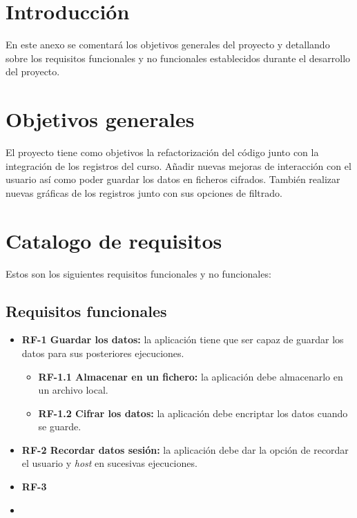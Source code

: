 
\section{Introducción}

En este anexo se comentará los objetivos generales del proyecto y detallando sobre los requisitos funcionales y no funcionales establecidos durante el desarrollo del proyecto.

\section{Objetivos generales}
El proyecto tiene como objetivos la refactorización del código junto con la integración de los registros del curso. Añadir nuevas mejoras de interacción con el usuario así como poder guardar los datos en ficheros cifrados. También realizar nuevas gráficas de los registros junto con sus opciones de filtrado.

\section{Catalogo de requisitos}

Estos son los siguientes requisitos funcionales y no funcionales:

\subsection{Requisitos funcionales}

\begin{itemize}
	

	\item \textbf{RF-1 Guardar los datos:} la aplicación tiene que ser capaz de guardar los datos para sus posteriores ejecuciones.
	\begin{itemize}
		\item \textbf{RF-1.1 Almacenar en un fichero:} la aplicación debe almacenarlo en un archivo local.
		\item \textbf{RF-1.2 Cifrar los datos:} la aplicación debe encriptar los datos cuando se guarde.
	\end{itemize}
	\item \textbf{RF-2 Recordar datos sesión:} la aplicación debe dar la opción de recordar el usuario y \textit{host} en sucesivas ejecuciones.
	\item \textbf{RF-3 }
	\item 
	
\end{itemize}

